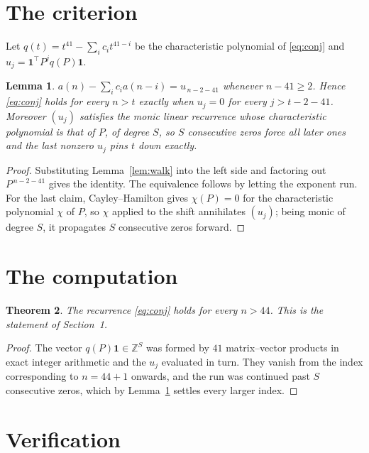 \documentclass[11pt,a4paper]{article}
\theoremstyle{plain}
\newtheorem{theorem}{Theorem}
\newtheorem{lemma}[theorem]{Lemma}
\theoremstyle{definition}
\begin{document}
\section{The criterion}

Let $q(t)=t^{41}-\sum_i c_i t^{41-i}$ be the characteristic polynomial of
\eqref{eq:conj} and $u_j=\mathbf{1}^{\!\top}P^{j}q(P)\mathbf{1}$.

\begin{lemma}\label{lem:crit}
$a(n)-\sum_i c_i a(n-i)=u_{\,n-2-41}$ whenever $n-41\ge2$. Hence
\eqref{eq:conj} holds for every $n>t$ exactly when $u_j=0$ for every
$j>t-2-41$. Moreover $(u_j)$ satisfies the monic linear recurrence whose
characteristic polynomial is that of $P$, of degree $S$, so $S$ consecutive zeros force all
later ones and the last nonzero $u_j$ pins $t$ down exactly.
\end{lemma}

\begin{proof}
Substituting Lemma~\ref{lem:walk} into the left side and factoring out
$P^{\,n-2-41}$ gives the identity. The equivalence follows by letting the exponent
run. For the last claim, Cayley--Hamilton gives $\chi(P)=0$ for the characteristic
polynomial $\chi$ of $P$, so $\chi$ applied to the shift annihilates $(u_j)$; being monic of
degree $S$, it propagates $S$ consecutive zeros forward.
\end{proof}

\section{The computation}

\begin{theorem}
The recurrence \eqref{eq:conj} holds for every $n>44$. This is the statement of
Section~1.
\end{theorem}

\begin{proof}
The vector $q(P)\mathbf{1}\in\mathbb{Z}^{S}$ was formed by $41$ matrix--vector
products in exact integer arithmetic and the $u_j$ evaluated in turn. They vanish from the
index corresponding to $n=44+1$ onwards, and the run was continued past $S$ consecutive
zeros, which by Lemma~\ref{lem:crit} settles every larger index.
\end{proof}

\section{Verification}
\end{document}
